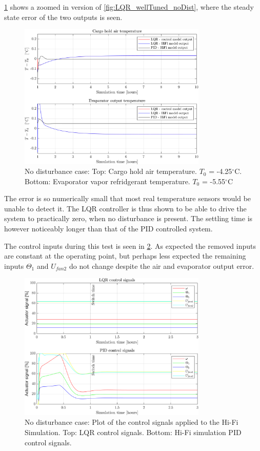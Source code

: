 \noindent \cref{fig:LQR_wellTuned_noDist_zoom} shows a zoomed in version of \cref{fig:LQR_wellTuned_noDist}, where the steady state error of the two outputs is seen.


\begin{figure}[H]
	\centering
	\includegraphics[width=0.8\textwidth]{Graphics/fig_LQRvsKresten_noDist_zoom.png}
	\caption{No disturbance case: Top: Cargo hold air temperature. $T_0$ = -4.25$^{\circ}$C. Bottom: Evaporator vapor refridgerant temperature. $T_0$ = -5.55$^{\circ}$C}
	\label{fig:LQR_wellTuned_noDist_zoom}
\end{figure}

\noindent The error is so numerically small that most real temperature sensors would be unable to detect it. The LQR controller is thus shown to be able to drive the system to practically zero, when no disturbance is present. The settling time is however noticeably longer than that of the PID controlled system.

The control inputs during this test is seen in \cref{fig:inputs_noDist}. As expected the removed inputs are constant at the operating point, but perhaps less expected the remaining inputs $\Theta_1$ and $U_{fan2}$ do not change despite the air and evaporator output error.

\begin{figure}[H]
	\centering
	\includegraphics[width=0.8\textwidth]{Graphics/fig_inputs_noDist.png}
	\caption{No disturbance case: Plot of the control signals applied to the Hi-Fi Simulation. Top: LQR control signals. Bottom: Hi-Fi simulation PID control signals.}
	\label{fig:inputs_noDist}
\end{figure}

